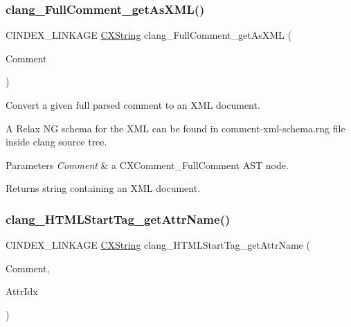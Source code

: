 \subsubsection{\texorpdfstring{clang\+\_\+\+Full\+Comment\+\_\+get\+As\+X\+M\+L()}{clang\_FullComment\_getAsXML()}}
{\footnotesize\ttfamily C\+I\+N\+D\+E\+X\+\_\+\+L\+I\+N\+K\+A\+GE \mbox{\hyperlink{structCXString}{C\+X\+String}} clang\+\_\+\+Full\+Comment\+\_\+get\+As\+X\+ML (\begin{DoxyParamCaption}\item[{\mbox{\hyperlink{structCXComment}{C\+X\+Comment}}}]{Comment }\end{DoxyParamCaption})}



Convert a given full parsed comment to an X\+ML document. 

A Relax NG schema for the X\+ML can be found in comment-\/xml-\/schema.\+rng file inside clang source tree.


\begin{DoxyParams}{Parameters}
{\em Comment} & a {\ttfamily C\+X\+Comment\+\_\+\+Full\+Comment} A\+ST node.\\
\hline
\end{DoxyParams}
\begin{DoxyReturn}{Returns}
string containing an X\+ML document. 
\end{DoxyReturn}
\mbox{\label{group__CINDEX__COMMENT_ga4bdf958af343477fc70eb2b4822cd006}} 
\subsubsection{\texorpdfstring{clang\+\_\+\+H\+T\+M\+L\+Start\+Tag\+\_\+get\+Attr\+Name()}{clang\_HTMLStartTag\_getAttrName()}}
{\footnotesize\ttfamily C\+I\+N\+D\+E\+X\+\_\+\+L\+I\+N\+K\+A\+GE \mbox{\hyperlink{structCXString}{C\+X\+String}} clang\+\_\+\+H\+T\+M\+L\+Start\+Tag\+\_\+get\+Attr\+Name (\begin{DoxyParamCaption}\item[{\mbox{\hyperlink{structCXComment}{C\+X\+Comment}}}]{Comment,  }\item[{unsigned}]{Attr\+Idx }\end{DoxyParamCaption})}


